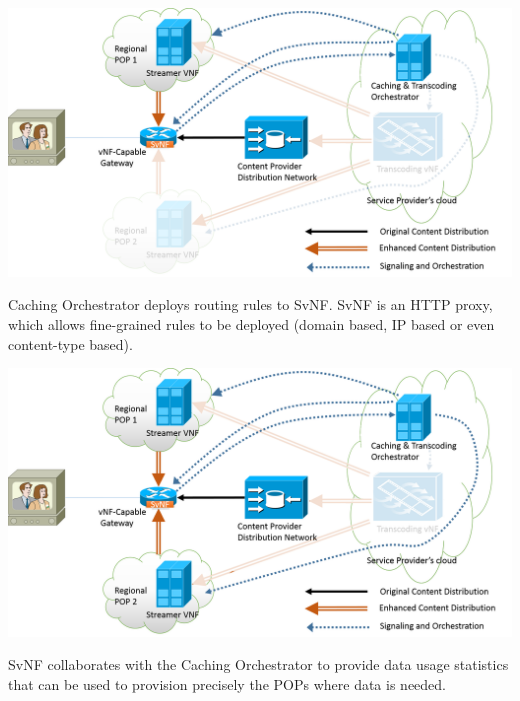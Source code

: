\documentclass[a4paper]{beamer}
\begin{document}
\begin{frame}[plain,T]{}
	\centering
	\includegraphics[width=0.95\linewidth]{highleveldesign4.png}
	\vspace{1em}
	\begin{block}{}
		Caching Orchestrator deploys routing rules to SvNF. SvNF is an HTTP proxy, which allows fine-grained rules to be deployed (domain based, IP based or even content-type based).
	\end{block}
\end{frame}


\begin{frame}[plain,T]{}
	\centering
	\includegraphics[width=0.95\linewidth]{highleveldesign5.png}
		\vspace{1em}
	\begin{block}{}
		SvNF collaborates with the Caching Orchestrator to provide data usage statistics that can be used to provision precisely the POPs where data is needed.
	\end{block}

\end{frame}
\end{document}
